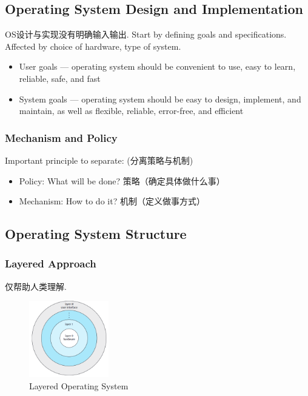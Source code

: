 \subsection{Operating System Design and Implementation}
OS设计与实现没有明确输入输出. Start by defining goals and specifications. Affected by choice of hardware, type of system. 

\begin{itemize}
    \item User goals --- operating system should be convenient to use, easy to learn, reliable, safe, and fast
    \item System goals --- operating system should be easy to design, implement, and maintain, as well as flexible, reliable, error-free, and efficient
\end{itemize}


\subsubsection{Mechanism and Policy} %
Important principle to separate: (分离策略与机制)
\begin{itemize}
    \item Policy: What will be done? 策略（确定具体做什么事）
    \item Mechanism: How to do it? 机制（定义做事方式）
\end{itemize}

\subsection{Operating System Structure}

\subsubsection{Layered Approach}
仅帮助人类理解. 
\begin{figure}[!htb]
    \centering
    \includegraphics[width=0.309\textwidth]{pic/OS2/Layered Operating System}
    \caption{Layered Operating System}
\end{figure}

